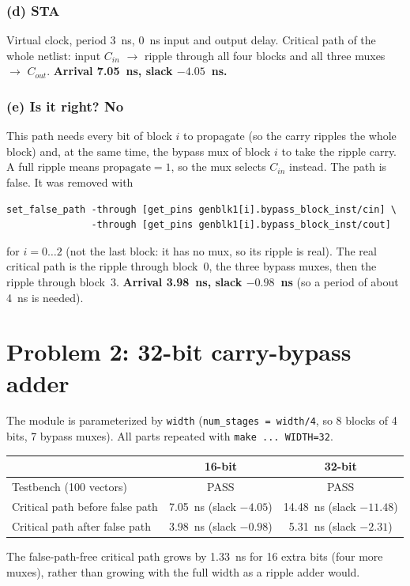 \subsubsection{(d) STA}

Virtual clock, period 3~ns, 0~ns input and output delay. Critical path of the whole netlist:
input $C_{in}$ $\to$ ripple through all four blocks and all three muxes $\to$ $C_{out}$.
\textbf{Arrival 7.05~ns, slack $-4.05$~ns.}

\subsubsection{(e) Is it right? No}

This path needs every bit of block $i$ to propagate (so the carry ripples the whole block) and, at the same time, the bypass mux of block $i$ to take the ripple carry. A full ripple means $\text{propagate}=1$, so the mux selects $C_{in}$ instead. The path is false. It was removed with
\begin{verbatim}
set_false_path -through [get_pins genblk1[i].bypass_block_inst/cin] \
               -through [get_pins genblk1[i].bypass_block_inst/cout]
\end{verbatim}
for $i = 0 \ldots 2$ (not the last block: it has no mux, so its ripple is real). The real critical path is the ripple through block~0, the three bypass muxes, then the ripple through block~3. \textbf{Arrival 3.98~ns, slack $-0.98$~ns} (so a period of about 4~ns is needed).

\section{Problem 2: 32-bit carry-bypass adder}

The module is parameterized by \texttt{width} (\texttt{num\_stages = width/4}, so 8 blocks of 4 bits, 7 bypass muxes). All parts repeated with \texttt{make ... WIDTH=32}.

\begin{center}
\begin{tabular}{lcc}
\hline
 & 16-bit & 32-bit \\
\hline
Testbench (100 vectors) & PASS & PASS \\
Critical path before false path & 7.05~ns (slack $-4.05$) & 14.48~ns (slack $-11.48$) \\
Critical path after false path & 3.98~ns (slack $-0.98$) & 5.31~ns (slack $-2.31$) \\
\hline
\end{tabular}
\end{center}

The false-path-free critical path grows by 1.33~ns for 16 extra bits (four more muxes), rather than growing with the full width as a ripple adder would.
